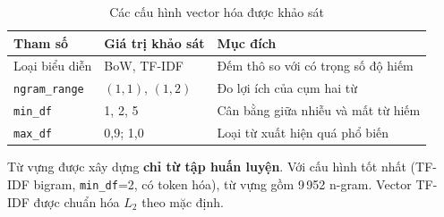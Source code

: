 \begin{table}[H]
\centering
\caption{Các cấu hình vector hóa được khảo sát}
\label{tab:vectorizer}
\begin{tabular}{|p{3.6cm}|p{4.6cm}|p{5.8cm}|}
\hline
\textbf{Tham số} & \textbf{Giá trị khảo sát} & \textbf{Mục đích} \\
\hline
Loại biểu diễn & BoW, TF-IDF & Đếm thô so với có trọng số độ hiếm \\
\hline
\texttt{ngram\_range} & $(1,1)$, $(1,2)$ & Đo lợi ích của cụm hai từ \\
\hline
\texttt{min\_df} & 1, 2, 5 & Cân bằng giữa nhiễu và mất từ hiếm \\
\hline
\texttt{max\_df} & 0,9; 1,0 & Loại từ xuất hiện quá phổ biến \\
\hline
\end{tabular}
\end{table}

Từ vựng được xây dựng \textbf{chỉ từ tập huấn luyện}. Với cấu hình tốt nhất (TF-IDF bigram, \texttt{min\_df}=2, có token hóa), từ vựng gồm 9\,952 n-gram. Vector TF-IDF được chuẩn hóa $L_2$ theo mặc định.
